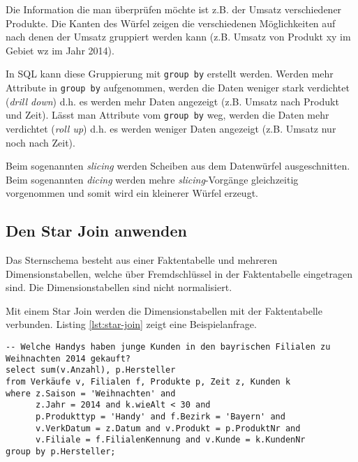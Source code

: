 Die Information die man überprüfen möchte ist z.B. der Umsatz verschiedener Produkte. Die Kanten des Würfel zeigen die verschiedenen Möglichkeiten auf nach denen der Umsatz gruppiert werden kann (z.B. Umsatz von Produkt xy im Gebiet wz im Jahr 2014). 

In SQL kann diese Gruppierung mit \texttt{group by} erstellt werden. Werden mehr Attribute in \texttt{group by} aufgenommen, werden die Daten weniger stark verdichtet (\emph{drill down}) d.h. es werden mehr Daten angezeigt (z.B. Umsatz nach Produkt und Zeit). Lässt man Attribute vom \texttt{group by} weg, werden die Daten mehr verdichtet (\emph{roll up}) d.h. es werden weniger Daten angezeigt (z.B. Umsatz nur noch nach Zeit).

Beim sogenannten \emph{slicing} werden Scheiben aus dem Datenwürfel ausgeschnitten. Beim sogenannten \emph{dicing} werden mehre \emph{slicing}-Vorgänge gleichzeitig vorgenommen und somit wird ein kleinerer Würfel erzeugt.

\newpage

\subsection{Den Star Join anwenden}

Das Sternschema besteht aus einer Faktentabelle und mehreren Dimensionstabellen, welche über Fremdschlüssel in der Faktentabelle eingetragen sind. Die Dimensionstabellen sind nicht normalisiert.

Mit einem Star Join werden die Dimensionstabellen mit der Faktentabelle verbunden. Listing \ref{lst:star-join} zeigt eine Beispielanfrage.

\begin{lstlisting}[caption={Star Join},label=lst:star-join]
-- Welche Handys haben junge Kunden in den bayrischen Filialen zu Weihnachten 2014 gekauft?
select sum(v.Anzahl), p.Hersteller
from Verkäufe v, Filialen f, Produkte p, Zeit z, Kunden k
where z.Saison = 'Weihnachten' and
	  z.Jahr = 2014 and k.wieAlt < 30 and
	  p.Produkttyp = 'Handy' and f.Bezirk = 'Bayern' and
	  v.VerkDatum = z.Datum and v.Produkt = p.ProduktNr and
	  v.Filiale = f.FilialenKennung and v.Kunde = k.KundenNr
group by p.Hersteller;
\end{lstlisting}
